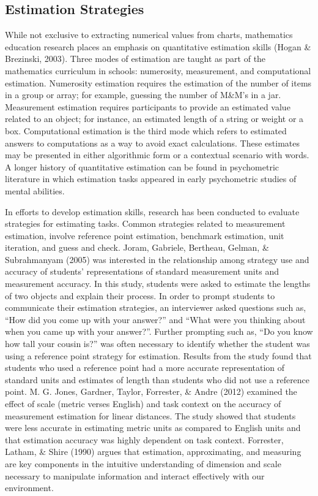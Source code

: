 \documentclass[print]{nuthesis}
\begin{document}
\hypertarget{estimation-strategies}{%
\subsection{Estimation Strategies}\label{estimation-strategies}}

While not exclusive to extracting numerical values from charts, mathematics education research places an emphasis on quantitative estimation skills (Hogan \& Brezinski, 2003).
Three modes of estimation are taught as part of the mathematics curriculum in schools: numerosity, measurement, and computational estimation.
Numerosity estimation requires the estimation of the number of items in a group or array; for example, guessing the number of M\&M's in a jar.
Measurement estimation requires participants to provide an estimated value related to an object; for instance, an estimated length of a string or weight or a box.
Computational estimation is the third mode which refers to estimated answers to computations as a way to avoid exact calculations.
These estimates may be presented in either algorithmic form or a contextual scenario with words.
A longer history of quantitative estimation can be found in psychometric literature in which estimation tasks appeared in early psychometric studies of mental abilities.

In efforts to develop estimation skills, research has been conducted to evaluate strategies for estimating tasks.
Common strategies related to measurement estimation, involve reference point estimation, benchmark estimation, unit iteration, and guess and check.
Joram, Gabriele, Bertheau, Gelman, \& Subrahmanyam (2005) was interested in the relationship among strategy use and accuracy of students' representations of standard measurement units and measurement accuracy.
In this study, students were asked to estimate the lengths of two objects and explain their process.
In order to prompt students to communicate their estimation strategies, an interviewer asked questions such as, ``How did you come up with your answer?'' and ``What were you thinking about when you came up with your answer?''.
Further prompting such as, ``Do you know how tall your cousin is?'' was often necessary to identify whether the student was using a reference point strategy for estimation.
Results from the study found that students who used a reference point had a more accurate representation of standard units and estimates of length than students who did not use a reference point.
M. G. Jones, Gardner, Taylor, Forrester, \& Andre (2012) examined the effect of scale (metric verses English) and task context on the accuracy of measurement estimation for linear distances.
The study showed that students were less accurate in estimating metric units as compared to English units and that estimation accuracy was highly dependent on task context.
Forrester, Latham, \& Shire (1990) argues that estimation, approximating, and measuring are key components in the intuitive understanding of dimension and scale necessary to manipulate information and interact effectively with our environment.
\end{document}

